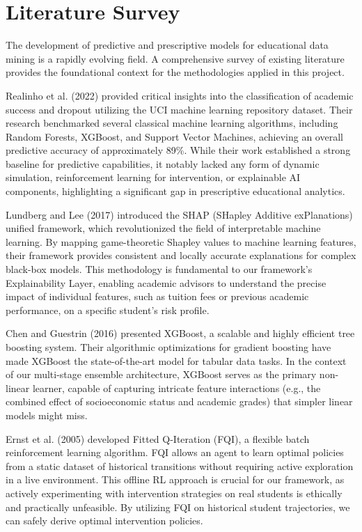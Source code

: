 \documentclass[12pt,a4paper]{report}
\begin{document}
\chapter{Literature Survey}

The development of predictive and prescriptive models for educational data mining is a rapidly evolving field. A comprehensive survey of existing literature provides the foundational context for the methodologies applied in this project. 

Realinho et al. (2022) \cite{realinho2022} provided critical insights into the classification of academic success and dropout utilizing the UCI machine learning repository dataset. Their research benchmarked several classical machine learning algorithms, including Random Forests, XGBoost, and Support Vector Machines, achieving an overall predictive accuracy of approximately 89\%. While their work established a strong baseline for predictive capabilities, it notably lacked any form of dynamic simulation, reinforcement learning for intervention, or explainable AI components, highlighting a significant gap in prescriptive educational analytics.

Lundberg and Lee (2017) \cite{lundberg2017} introduced the SHAP (SHapley Additive exPlanations) unified framework, which revolutionized the field of interpretable machine learning. By mapping game-theoretic Shapley values to machine learning features, their framework provides consistent and locally accurate explanations for complex black-box models. This methodology is fundamental to our framework's Explainability Layer, enabling academic advisors to understand the precise impact of individual features, such as tuition fees or previous academic performance, on a specific student's risk profile.

Chen and Guestrin (2016) \cite{chen2016} presented XGBoost, a scalable and highly efficient tree boosting system. Their algorithmic optimizations for gradient boosting have made XGBoost the state-of-the-art model for tabular data tasks. In the context of our multi-stage ensemble architecture, XGBoost serves as the primary non-linear learner, capable of capturing intricate feature interactions (e.g., the combined effect of socioeconomic status and academic grades) that simpler linear models might miss.

Ernst et al. (2005) \cite{ernst2005} developed Fitted Q-Iteration (FQI), a flexible batch reinforcement learning algorithm. FQI allows an agent to learn optimal policies from a static dataset of historical transitions without requiring active exploration in a live environment. This offline RL approach is crucial for our framework, as actively experimenting with intervention strategies on real students is ethically and practically unfeasible. By utilizing FQI on historical student trajectories, we can safely derive optimal intervention policies.
\end{document}
